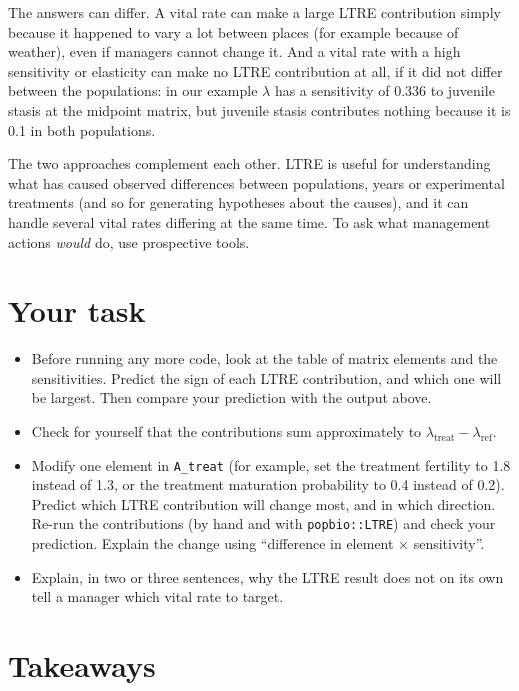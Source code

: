 \documentclass[
  a4paper]{book}
\providecommand{\tightlist}{%
  \setlength{\itemsep}{0pt}\setlength{\parskip}{0pt}}
\begin{document}
The answers can differ. A vital rate can make a large LTRE contribution simply because it happened to vary a lot between places (for example because of weather), even if managers cannot change it. And a vital rate with a high sensitivity or elasticity can make no LTRE contribution at all, if it did not differ between the populations: in our example \(\lambda\) has a sensitivity of 0.336 to juvenile stasis at the midpoint matrix, but juvenile stasis contributes nothing because it is 0.1 in both populations.

The two approaches complement each other. LTRE is useful for understanding what has caused observed differences between populations, years or experimental treatments (and so for generating hypotheses about the causes), and it can handle several vital rates differing at the same time. To ask what management actions \emph{would} do, use prospective tools.

\section{Your task}\label{your-task-10}

\begin{itemize}
\tightlist
\item
  Before running any more code, look at the table of matrix elements and the sensitivities. Predict the sign of each LTRE contribution, and which one will be largest. Then compare your prediction with the output above.
\item
  Check for yourself that the contributions sum approximately to \(\lambda_{\mathrm{treat}} - \lambda_{\mathrm{ref}}\).
\item
  Modify one element in \texttt{A\_treat} (for example, set the treatment fertility to 1.8 instead of 1.3, or the treatment maturation probability to 0.4 instead of 0.2). Predict which LTRE contribution will change most, and in which direction. Re-run the contributions (by hand and with \texttt{popbio::LTRE}) and check your prediction. Explain the change using ``difference in element × sensitivity''.
\item
  Explain, in two or three sentences, why the LTRE result does not on its own tell a manager which vital rate to target.
\end{itemize}

\section{Takeaways}\label{takeaways-10}
\end{document}

